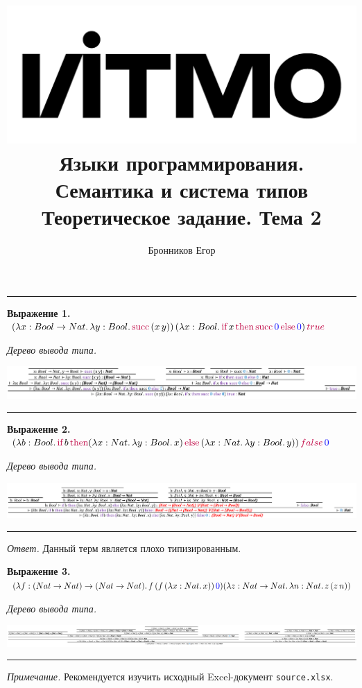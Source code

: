 \documentclass[landscape, 11pt]{report}
\title{
	\includegraphics[scale=0.07]{logo}\\
	\vspace{0.5em}
	Языки программирования. Семантика и система типов\\
	\vspace{0.2em}
	\Large Теоретическое задание. Тема 2
}
\author{Бронников Егор}
\date{}
\begin{document}

\maketitle

\vspace{-0.5cm}
\hrule
\vspace{0.6cm}



\textbf{Выражение 1.} $(\lambda x : Bool \rightarrow Nat. \, \lambda y : Bool . \, \text{\color{purple}succ} \, (x \, y)) \, (\lambda x : Bool. \, \text{\color{purple}if} \, x \, \text{\color{purple}then} \, \text{\color{purple}succ} \, {\color{blue}0} \, \text{\color{purple}else} \, {\color{blue}0}) \, \color{purple}true$

\vspace{0.2cm}

\textit{Дерево вывода типа.}

\includegraphics[scale=0.35]{task-1.png}

\vspace{0.5cm}
\hrule
\vspace{0.5cm}




\textbf{Выражение 2.} $(\lambda b : Bool. \, \text{\color{purple}if} \, b \, \text{\color{purple}then} (\lambda x : Nat. \, \lambda y : Bool. \, x) \, \text{\color{purple}else} \, (\lambda x : Nat. \, \lambda y: Bool. \, y)) \, {\color{purple} false} \, {\color{blue}0}$

\vspace{0.2cm}

\textit{Дерево вывода типа.}

\includegraphics[scale=0.35]{task-2.png}

\vspace{0.5cm}
\hrule
\vspace{0.5cm}

\textit{Ответ.} Данный терм является плохо типизированным.




\textbf{Выражение 3.} $(\lambda f : (Nat \rightarrow Nat) \rightarrow (Nat \rightarrow Nat). \, f \, (f \, (\lambda x : Nat. \, x)) \, {\color{blue}0}) (\lambda z : Nat \rightarrow Nat. \, \lambda n : Nat. \, z \, (z \, n))$
\vspace{0.2cm}

\textit{Дерево вывода типа.}

\includegraphics[scale=0.35]{task-3.png}

\vspace{0.5cm}
\hrule
\vspace{0.5cm}


\vfill

\small \textit{Примечание.} Рекомендуется изучить исходный Excel-документ \verb|source.xlsx|.
\end{document}
